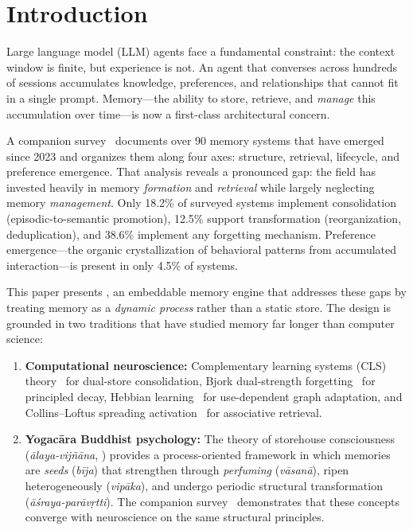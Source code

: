 \section{Introduction}
\label{sec:introduction}

Large language model (LLM) agents face a fundamental constraint: the context
window is finite, but experience is not. An agent that converses across
hundreds of sessions accumulates knowledge, preferences, and relationships
that cannot fit in a single prompt. Memory---the ability to store, retrieve,
and \emph{manage} this accumulation over time---is now a first-class
architectural concern.

A companion survey~\cite{hui2026taxonomy} documents over 90 memory systems
that have emerged since 2023 and organizes them along four axes: structure,
retrieval, lifecycle, and preference emergence. That analysis reveals a
pronounced gap: the field has invested heavily in memory \emph{formation} and
\emph{retrieval} while largely neglecting memory \emph{management}. Only
18.2\% of surveyed systems implement consolidation (episodic-to-semantic
promotion), 12.5\% support transformation (reorganization, deduplication),
and 38.6\% implement any forgetting mechanism. Preference emergence---the
organic crystallization of behavioral patterns from accumulated
interaction---is present in only 4.5\% of systems.

This paper presents \alaya{}, an embeddable memory engine that addresses
these gaps by treating memory as a \emph{dynamic process} rather than a
static store. The design is grounded in two traditions that have studied
memory far longer than computer science:

\begin{enumerate}[leftmargin=*, nosep]
    \item \textbf{Computational neuroscience:} Complementary learning
    systems (CLS) theory~\cite{mcclelland1995} for dual-store consolidation,
    Bjork dual-strength forgetting~\cite{bjork1992} for principled decay,
    Hebbian learning~\cite{hebb1949} for use-dependent graph adaptation, and
    Collins--Loftus spreading activation~\cite{collins1975} for associative
    retrieval.

    \item \textbf{Yogac\=ara Buddhist psychology:} The theory of storehouse
    consciousness (\emph{\=alaya-vij\~n\=ana}, ) provides a
    process-oriented framework in which memories are \emph{seeds}
    (\emph{b\=ija}) that strengthen through \emph{perfuming}
    (\emph{v\=asan\=a}), ripen heterogeneously (\emph{vip\=aka}), and
    undergo periodic structural transformation
    (\emph{\=a\'sraya-par\=av\d{r}tti}). The companion
    survey~\cite{hui2026taxonomy} demonstrates that these concepts converge
    with neuroscience on the same structural principles.
\end{enumerate}

